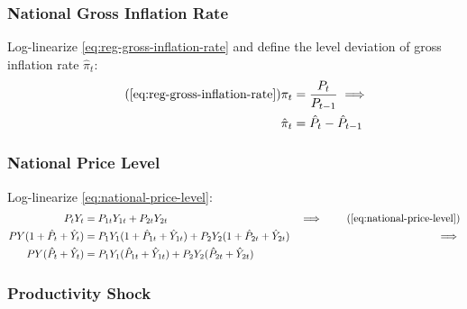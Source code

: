 \documentclass[
thesis.tex
]{subfiles}
\begin{document}

\subsubsection*{National Gross Inflation Rate}

Log-linearize \ref{eq:reg-gross-inflation-rate} and define the level deviation of gross inflation rate $\hat{\pi}_t$:
\begin{align}
	\tag{\ref{eq:reg-gross-inflation-rate}}
	\pi_{t} &= \frac{P_{t}}{P_{t-1}} \implies \\
	\hat{\pi}_{t} &= \hat{P}_{t} - \hat{P}_{t-1}
	\label{eq:reg-level-dev-gross-inflation-rate}
\end{align}


\subsubsection*{National Price Level}

Log-linearize \ref{eq:national-price-level}:
\begin{alignat}{2}
	P_{t} Y_{t} &= P_{1t} Y_{1t} + P_{2t} Y_{2t} & \implies \tag{\ref{eq:national-price-level}} \\ 
	P Y (1 + \hat{P}_{t} + \hat{Y}_{t}) &= P_{1} Y_{1} (1 + \hat{P}_{1t} + \hat{Y}_{1t}) + P_{2} Y_{2} (1 + \hat{P}_{2t} + \hat{Y}_{2t}) &\implies \nonumber \\
	P Y (\hat{P}_{t} + \hat{Y}_{t}) &= P_{1} Y_{1} (\hat{P}_{1t} + \hat{Y}_{1t}) + P_{2} Y_{2} (\hat{P}_{2t} + \hat{Y}_{2t}) \label{eq:reg-ll-national-price-level}
\end{alignat}

\begin{comment}
	P_{t} &= \theta_{P1} P_{1t} + (1 -\theta_{P1}) P_{2t} &\implies \tag{\ref{eq:national-price-level}} \\ 
	P (1 +\hat{P}_{t}) &= \theta_{P1} P_{1} (1 +\hat{P}_{1t}) + (1 -\theta_{P1}) P_{2} (1 +\hat{P}_{2t}) &\implies \nonumber \\
	\hat{P}_{t} &= \theta_{P1} \hat{P}_{1t} + (1 -\theta_{P1}) \hat{P}_{2t} %
\end{comment}


\subsubsection*{Productivity Shock}
\end{document}
